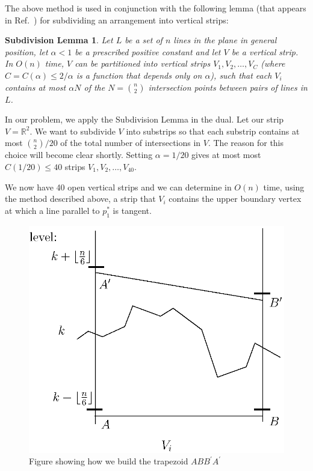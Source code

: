 \documentclass{elsart}
\newtheorem{thma}{Subdivision Lemma}
\begin{document}
The above method is used in conjunction with the following lemma
(that appears in Ref.~\cite{algorithms_for_ham_sandwich_cuts}) for
subdividing an arrangement into vertical strips:

\begin{thma}
Let $L$ be a set of $n$ lines in the plane in general position, let
$\alpha < 1$ be a prescribed positive constant and let $V$ be a
vertical strip. In $O(n)$ time, $V$ can be partitioned into vertical
strips $V_1, V_2, \ldots, V_C$ (where $C = C(\alpha)\le 2/\alpha$ is a function
that depends only on $\alpha$), such that each $V_i$ contains at most
$\alpha N$ of the $N = {n \choose 2}$ intersection points between
pairs of lines in
$L$. 
\end{thma}

In our problem, we apply the Subdivision Lemma in the dual. Let our
strip $V=\mathbb{R}^2$.  We want to subdivide $V$ into substrips so
that each substrip contains at most ${n\choose 2}/20$ of the total
number of intersections in $V$. The reason for this choice will become
clear shortly. Setting $\alpha = {1}/{20}$ gives at most most
$C(1/20)\le 40$ strips $V_1, V_2, \ldots, V_{40}$.

We now have 40 open vertical strips and we can determine in $O(n)$
time, using the method described above, a strip that $V_i$ contains
the upper boundary vertex at which a line parallel to $p_1^*$ is
tangent. 

\begin{figure}
 \begin{center}
   \includegraphics{fig6}
   \caption{\label{fig_trapezoid}Figure showing how we build the trapezoid $ABB^{\prime}A^{\prime}$}
 \end{center}
\end{figure}
\end{document}
